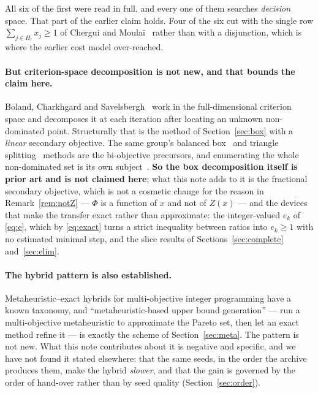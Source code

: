 \documentclass[11pt,a4paper]{article}
\newcommand{\Z}{Z}
\begin{document}
\noindent
All six of the first were read in full, and every one of them searches
\emph{decision} space. That part of the earlier claim holds.  Four of the six
cut with the single row $\sum_{j \in H_l} x_j \geqslant 1$ of Chergui and
Moula\"i~\cite{cherguimoulai2008} rather than with a disjunction, which is
where the earlier cost model over-reached.

\paragraph{But criterion-space decomposition is not new, and that bounds the
claim here.}
Boland, Charkhgard and Savelsbergh~\cite{boland2017} work in the
full-dimensional criterion
space and decomposes it at each iteration after locating an unknown
non-dominated point. Structurally that is the method of
Section~\ref{sec:box} with a \emph{linear} secondary objective. The same group's
balanced box~\cite{balancedbox} and triangle
splitting~\cite{trianglesplitting} methods are the bi-objective
precursors, and enumerating the whole non-dominated set is its own
subject~\cite{ozlen2009,lokman2013}. \textbf{So the box decomposition itself is prior art and is not
claimed here}; what this note adds to it is the fractional secondary objective,
which is not a cosmetic change for the reason in
Remark~\ref{rem:notZ} --- $\Phi$ is a function of $x$ and not of $\Z(x)$ --- and
the devices that make the transfer exact rather than approximate: the
integer-valued $e_k$ of \eqref{eq:e}, which by \eqref{eq:exact} turns a strict
inequality between ratios into $e_k \geqslant 1$ with no estimated minimal step, and the slice
results of Sections~\ref{sec:complete} and~\ref{sec:elim}.

\paragraph{The hybrid pattern is also established.}
Metaheuristic--exact hybrids for multi-objective integer programming have a
known taxonomy, and ``metaheuristic-based upper bound generation'' --- run a
multi-objective metaheuristic to approximate the Pareto set, then let an exact
method refine it --- is exactly the scheme of Section~\ref{sec:meta}. The
pattern is not new. What this note contributes about it is negative and
specific, and we have not found it stated elsewhere: that the same seeds, in
the order the archive produces them, make the hybrid \emph{slower}, and that
the gain is governed by the order of hand-over rather than by seed quality
(Section~\ref{sec:order}).
\end{document}
